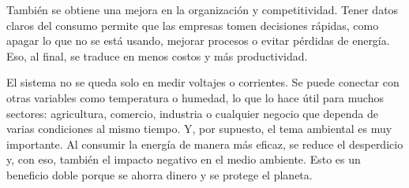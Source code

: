 También se obtiene una mejora en la organización y competitividad. Tener datos claros del consumo permite que las empresas tomen decisiones rápidas, como apagar lo que no se está usando, mejorar procesos o evitar pérdidas de energía. Eso, al final, se traduce en menos costos y más productividad.

El sistema no se queda solo en medir voltajes o corrientes. Se puede conectar con otras variables como temperatura o humedad, lo que lo hace útil para muchos sectores: agricultura, comercio, industria o cualquier negocio que dependa de varias condiciones al mismo tiempo. Y, por supuesto, el tema ambiental es muy importante. Al consumir la energía de manera más eficaz, se reduce el desperdicio y, con eso, también el impacto negativo en el medio ambiente. Esto es un beneficio doble porque se ahorra dinero y se protege el planeta.



